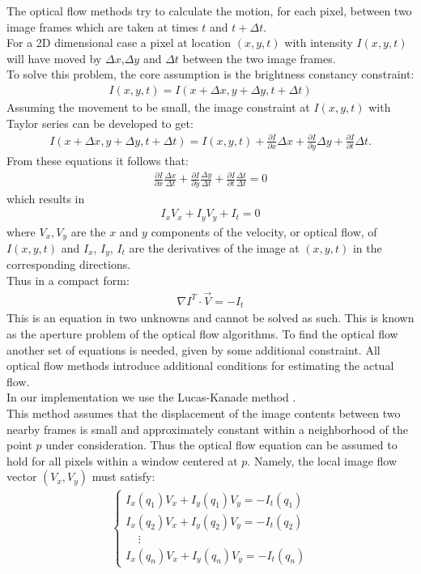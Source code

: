 The optical flow methods \cite{beauchemin1995computation} try to calculate the motion, for each pixel, between two image frames which are taken at times $t$ and $t+\Delta t$. \\
For a 2D dimensional case a pixel at location $(x,y,t)$ with intensity $I(x,y,t)$ will have moved by $\Delta x$,$\Delta y$ and $\Delta t$ between the two image frames. \\
To solve this problem, the core assumption is the brightness constancy constraint:
\begin{align}
I(x,y,t) = I(x+\Delta x, y + \Delta y, t + \Delta t)
\end{align}
Assuming the movement to be small, the image constraint at $I(x,y,t)$ with Taylor series can be developed to get:
\begin{align}
I(x+\Delta x,y+\Delta y,t+\Delta t) = I(x,y,t) + \frac{\partial I}{\partial x}\Delta x+\frac{\partial I}{\partial y}\Delta y+\frac{\partial I}{\partial t}\Delta t.
\end{align}
From these equations it follows that:
\begin{align}
 \frac{\partial I}{\partial x}\frac{\Delta x}{\Delta t}+\frac{\partial I}{\partial y}\frac{\Delta y}{\Delta t}+\frac{\partial I}{\partial t}\frac{\Delta t}{\Delta t} = 0
\end{align}
which results in
\begin{align}
 I_{x}V_x+I_{y}V_y+I_{t}= 0
\end{align}
where $V_x,V_y$ are the $x$ and $y$ components of the velocity, or optical flow, of $I(x,y,t)$ and $I_{x}$, $I_{y}$, $I_{t}$ are the derivatives of the image at $(x,y,t)$ in the corresponding directions.\\
Thus in a compact form:
\begin{align}
 \nabla I^T\cdot\vec{V} = -I_t
\end{align}
This is an equation in two unknowns and cannot be solved as such. This is known as the aperture problem of the optical flow algorithms. To find the optical flow another set of equations is needed, given by some additional constraint. All optical flow methods introduce additional conditions for estimating the actual flow.\\
In our implementation we use the Lucas-Kanade method \cite{lucas1981iterative}.\\
This method assumes that the displacement of the image contents between two nearby frames is small and approximately constant within a neighborhood of the point $p$ under consideration. Thus the optical flow equation can be assumed to hold for all pixels within a window centered at $p$. Namely, the local image flow vector $(V_{x},V_{y})$ must satisfy:
\begin{align}
\begin{cases}
I_{x}(q_{1})V_{x}+I_{y}(q_{1})V_{y}=-I_{t}(q_{1})  \\[10pt]
I_{x}(q_{2})V_{x}+I_{y}(q_{2})V_{y}=-I_{t}(q_{2})  \\[10pt]
\ \ \ \ \ \vdots \\[10pt]
I_{x}(q_{n})V_{x}+I_{y}(q_{n})V_{y}=-I_{t}(q_{n}) 
\end{cases}
\end{align}

